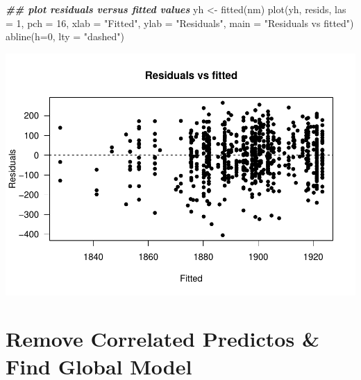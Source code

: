 \documentclass[
]{article}
\newenvironment{Shaded}{\begin{snugshade}}{\end{snugshade}}
\newcommand{\AttributeTok}[1]{\textcolor[rgb]{0.77,0.63,0.00}{#1}}
\newcommand{\DecValTok}[1]{\textcolor[rgb]{0.00,0.00,0.81}{#1}}
\newcommand{\DocumentationTok}[1]{\textcolor[rgb]{0.56,0.35,0.01}{\textbf{\textit{#1}}}}
\newcommand{\FunctionTok}[1]{\textcolor[rgb]{0.00,0.00,0.00}{#1}}
\newcommand{\NormalTok}[1]{#1}
\newcommand{\OtherTok}[1]{\textcolor[rgb]{0.56,0.35,0.01}{#1}}
\newcommand{\StringTok}[1]{\textcolor[rgb]{0.31,0.60,0.02}{#1}}
\begin{document}
\begin{Shaded}
\begin{Highlighting}[]
\DocumentationTok{\#\# plot residuals versus fitted values}
\NormalTok{yh }\OtherTok{\textless{}{-}} \FunctionTok{fitted}\NormalTok{(nm)}
\FunctionTok{plot}\NormalTok{(yh, resids, }\AttributeTok{las =} \DecValTok{1}\NormalTok{, }\AttributeTok{pch =} \DecValTok{16}\NormalTok{,}
     \AttributeTok{xlab =} \StringTok{"Fitted"}\NormalTok{, }\AttributeTok{ylab =} \StringTok{"Residuals"}\NormalTok{,}
     \AttributeTok{main =} \StringTok{"Residuals vs fitted"}\NormalTok{)}
\FunctionTok{abline}\NormalTok{(}\AttributeTok{h=}\DecValTok{0}\NormalTok{, }\AttributeTok{lty =} \StringTok{"dashed"}\NormalTok{)}
\end{Highlighting}
\end{Shaded}

\includegraphics{SCMU_egg_model_files/figure-latex/null_model-4.pdf}

\hypertarget{remove-correlated-predictos-find-global-model}{%
\section{Remove Correlated Predictos \& Find Global
Model}\label{remove-correlated-predictos-find-global-model}}
\end{document}
